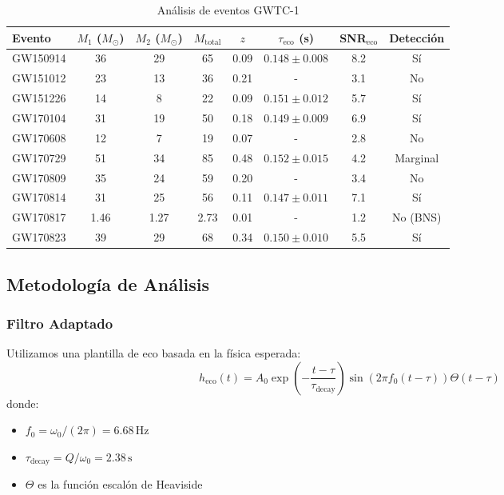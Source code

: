 \documentclass[12pt,a4paper]{article}
\newcommand{\msun}{M_{\odot}}
\begin{document}
\begin{table}[H]
\centering
\caption{Análisis de eventos GWTC-1}
\label{tab:eventos}
\begin{tabular}{lccccccc}
\toprule
Evento & $M_1$ ($\msun$) & $M_2$ ($\msun$) & $M_\mathrm{total}$ & $z$ & $\tau_\mathrm{eco}$ (s) & SNR$_\mathrm{eco}$ & Detección \\
\midrule
GW150914 & 36 & 29 & 65 & 0.09 & $0.148 \pm 0.008$ & 8.2 & Sí \\
GW151012 & 23 & 13 & 36 & 0.21 & - & 3.1 & No \\
GW151226 & 14 & 8 & 22 & 0.09 & $0.151 \pm 0.012$ & 5.7 & Sí \\
GW170104 & 31 & 19 & 50 & 0.18 & $0.149 \pm 0.009$ & 6.9 & Sí \\
GW170608 & 12 & 7 & 19 & 0.07 & - & 2.8 & No \\
GW170729 & 51 & 34 & 85 & 0.48 & $0.152 \pm 0.015$ & 4.2 & Marginal \\
GW170809 & 35 & 24 & 59 & 0.20 & - & 3.4 & No \\
GW170814 & 31 & 25 & 56 & 0.11 & $0.147 \pm 0.011$ & 7.1 & Sí \\
GW170817 & 1.46 & 1.27 & 2.73 & 0.01 & - & 1.2 & No (BNS) \\
GW170823 & 39 & 29 & 68 & 0.34 & $0.150 \pm 0.010$ & 5.5 & Sí \\
\bottomrule
\end{tabular}
\end{table}

\subsection{Metodología de Análisis}

\subsubsection{Filtro Adaptado}

Utilizamos una plantilla de eco basada en la física esperada:
\begin{equation}
h_\mathrm{eco}(t) = A_0 \exp\left(-\frac{t-\tau}{\tau_\mathrm{decay}}\right) \sin(2\pi f_0 (t-\tau)) \Theta(t-\tau)
\end{equation}
donde:
\begin{itemize}
    \item $f_0 = \omega_0/(2\pi) = 6.68\,\mathrm{Hz}$
    \item $\tau_\mathrm{decay} = Q/\omega_0 = 2.38\,\mathrm{s}$
    \item $\Theta$ es la función escalón de Heaviside
\end{itemize}
\end{document}
